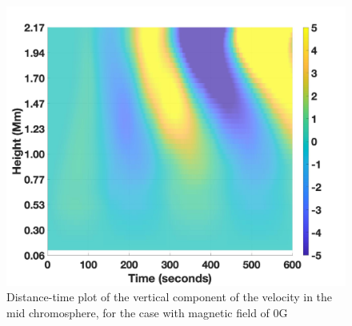 \documentclass[linenumbers]{aastex63}
\begin{document}
\begin{figure}
\centering
\label{td_vert_bv0G_300}
\includegraphics[scale=0.25]{td_vert_bv0G_300.jpg}
\caption{Distance-time plot of the vertical component of the velocity in the mid chromosphere, for the case with magnetic field of 0G}
\end{figure}
\end{document}
